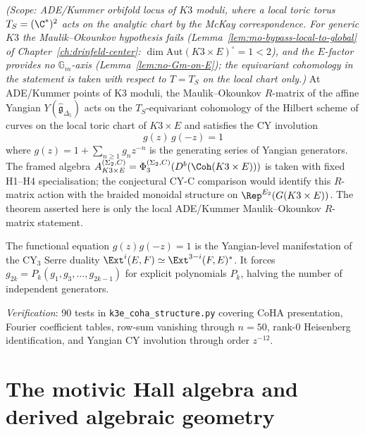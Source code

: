 \begin{theorem}
\label{thm:k3e-yangian}
\textit{(Scope: ADE/Kummer orbifold locus of $K3$ moduli, where a local toric torus $T_S = (\C^*)^2$ acts on the analytic chart by the McKay correspondence. For generic $K3$ the Maulik--Okounkov hypothesis fails (Lemma~\ref{lem:mo-bypass-local-to-global} of Chapter~\ref{ch:drinfeld-center}: $\dim \mathrm{Aut}(K3 \times E)^\circ = 1 < 2$), and the $E$-factor provides no $\mathbb{G}_m$-axis (Lemma~\ref{lem:no-Gm-on-E}); the equivariant cohomology in the statement is taken with respect to $T = T_S$ on the local chart only.)}
At ADE/Kummer points of K3 moduli, the Maulik--Okounkov $R$-matrix of the affine Yangian $Y(\widehat{\mathfrak{g}}_{\Delta_5})$ acts on the $T_S$-equivariant cohomology of the Hilbert scheme of curves on the local toric chart of $K3 \times E$ and satisfies the CY involution
\[
 g(z) \, g(-z) = 1
\]
where $g(z) = 1 + \sum_{n \geq 1} g_n z^{-n}$ is the generating series of Yangian generators. The framed algebra $A_{K3 \times E}^{(\Sigma_2,C)} = \Phi_3^{(\Sigma_2,C)}(D^b(\Coh(K3 \times E)))$ is taken with fixed H1--H4 specialisation; the conjectural CY-C comparison would identify this $R$-matrix action with the braided monoidal structure on $\Rep^{E_2}(G(K3 \times E))$. The theorem asserted here is only the local ADE/Kummer Maulik--Okounkov $R$-matrix statement.
\end{theorem}

\begin{remark}[CY involution]
\label{rem:k3e-cy-involution}
The functional equation $g(z)g(-z) = 1$ is the Yangian-level manifestation of the CY$_3$ Serre duality $\Ext^i(E,F) \simeq \Ext^{3-i}(F,E)^*$. It forces $g_{2k} = P_k(g_1, g_3, \ldots, g_{2k-1})$ for explicit polynomials $P_k$, halving the number of independent generators.
\end{remark}

\noindent\textit{Verification}: 90 tests in \texttt{k3e\_coha\_structure.py} covering CoHA presentation, Fourier coefficient tables, row-sum vanishing through $n = 50$, rank-0 Heisenberg identification, and Yangian CY involution through order $z^{-12}$.



\section{The motivic Hall algebra and derived algebraic geometry}
\label{sec:k3e-motivic-hall-dag}

